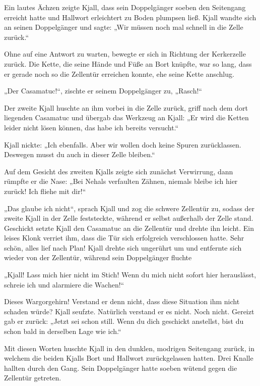 \documentclass[10pt, a4paper, oneside]{book}
\begin{document}
Ein lautes Ächzen zeigte Kjall, dass sein Doppelgänger soeben den Seitengang erreicht hatte und Hallwort erleichtert zu Boden plumpsen ließ. Kjall wandte sich an seinen Doppelgänger und sagte: „Wir müssen noch mal schnell in die Zelle zurück.“

Ohne auf eine Antwort zu warten, bewegte er sich in Richtung der Kerkerzelle zurück. Die Kette, die seine Hände und Füße an Bort knüpfte, war so lang, dass er gerade noch so die Zellentür erreichen konnte, ehe seine Kette anschlug.

„Der Casamatuc!“, zischte er seinem Doppelgänger zu, „Rasch!“

Der zweite Kjall huschte an ihm vorbei in die Zelle zurück, griff nach dem dort liegenden Casamatuc und übergab das Werkzeug an Kjall: „Er wird die Ketten leider nicht lösen können, das habe ich bereits versucht.“

Kjall nickte: „Ich ebenfalls. Aber wir wollen doch keine Spuren zurücklassen. Deswegen musst du auch in dieser Zelle bleiben.“

Auf dem Gesicht des zweiten Kjalls zeigte sich zunächst Verwirrung, dann rümpfte er die Nase: „Bei Nehals verfaulten Zähnen, niemals bleibe ich hier zurück! Ich fliehe mit dir!“

„Das glaube ich nicht“, sprach Kjall und zog die schwere Zellentür zu, sodass der zweite Kjall in der Zelle feststeckte, während er selbst außerhalb der Zelle stand. Geschickt setzte Kjall den Casamatuc an die Zellentür und drehte ihn leicht. Ein leises Klonk verriet ihm, dass die Tür sich erfolgreich verschlossen hatte. Sehr schön, alles lief nach Plan! Kjall drehte sich ungerührt um und entfernte sich wieder von der Zellentür, während sein Doppelgänger fluchte

„Kjall! Lass mich hier nicht im Stich! Wenn du mich nicht sofort hier herauslässt, schreie ich und alarmiere die Wachen!“

Dieses Wargorgehirn! Verstand er denn nicht, dass diese Situation ihm nicht schaden würde? Kjall seufzte. Natürlich verstand er es nicht. Noch nicht. Gereizt gab er zurück: „Jetzt sei schon still. Wenn du dich geschickt anstellst, bist du schon bald in derselben Lage wie ich.“

Mit diesen Worten huschte Kjall in den dunklen, modrigen Seitengang zurück, in welchem die beiden Kjalls Bort und Hallwort zurückgelassen hatten. Drei Knalle hallten durch den Gang. Sein Doppelgänger hatte soeben wütend gegen die Zellentür getreten.\bigskip
\end{document}
